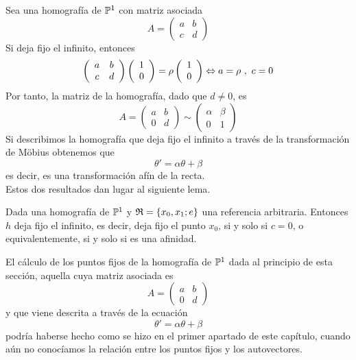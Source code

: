 Sea una homografía de $\mathbb{P}^1$ con matriz asociada
\begin{equation*}
	A=\left( \begin{array}{cc}
		a&b\\
		c&d
	\end{array}\right)
\end{equation*}
Si deja fijo el infinito, entonces
\begin{equation*}
	\left( \begin{array}{cc}
	a&b\\
	c&d
	\end{array}\right)
	\left( \begin{array}{c}
	1\\
	0
	\end{array}\right)=\rho\left( \begin{array}{c}
	1\\
	0
	\end{array}\right)\Leftrightarrow a=\rho \ , \ c=0
\end{equation*}
Por tanto, la matriz de la homografía, dado que $d\not=0$, es
\begin{equation*}
	A=\left( \begin{array}{cc}
		a&b\\
		0&d
	\end{array}\right)\sim 
	\left( \begin{array}{cc}
		\alpha&\beta\\
		0&1
	\end{array}\right)
\end{equation*}
Si describimos la homografía que deja fijo el infinito a través de la transformación de Möbius obtenemos que 
\begin{equation*}
	\theta'=\alpha\theta+\beta
\end{equation*}
es decir, es una transformación afín de la recta.\\

Estos dos resultados dan lugar al siguiente lema.
\begin{lem}\label{C6_lem_infinito_p1_sii_afinidad}
	Dada una homografía de $\mathbb{P}^1$ y $\mathfrak{R}=\{x_0,x_1;e\}$ una referencia arbitraria. Entonces $h$ deja fijo el infinito, es decir, deja fijo el punto $x_0$, si y solo si $c=0$, o equivalentemente, si y solo si es una afinidad.
\end{lem}

El cálculo de los puntos fijos de la homografía de $\mathbb{P}^1$ dada al principio de esta sección, aquella cuya matriz asociada es
\begin{equation*}
	A=\left( \begin{array}{cc}
		a&b\\
		0&d
	\end{array}\right)
\end{equation*}
y que viene descrita a través de la ecuación
\begin{equation*}
	\theta'=\alpha\theta+\beta
\end{equation*}
podría haberse hecho como se hizo en el primer apartado de este capítulo, cuando aún no conocíamos la relación entre los puntos fijos y los autovectores.

